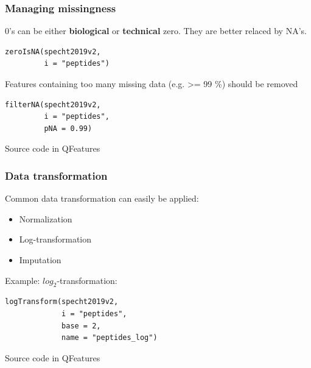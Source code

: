 \documentclass{beamer}
\newcommand{\hcode}[2][lgray]{{\ttfamily\color{vdgray}\colorbox{#1}{#2}}}
\newcommand{\frametitlesection}[1]{\frametitle{\centering #1 \footnotesize \hspace{0pt plus 1 filll} \insertsection}}
\begin{document}
\begin{frame}[fragile]
    \frametitlesection{Managing missingness}

    \hcode{0}'s can be either \textbf{biological} or \textbf{technical} zero.
    They are better relaced by \hcode{NA}'s.

    \begin{lstlisting}
zeroIsNA(specht2019v2,
         i = "peptides")
    \end{lstlisting}

    Features containing too many missing data (e.g. >= 99 \%) should be removed

    \begin{lstlisting}
filterNA(specht2019v2,
         i = "peptides",
         pNA = 0.99)
    \end{lstlisting}

    Source code in \hcode{QFeatures}

\end{frame}

\begin{frame}[fragile]
    \frametitlesection{Data transformation}

    Common data transformation can easily be applied:

    \begin{itemize}
        \item{Normalization}
        \item{Log-transformation}
        \item{Imputation}
    \end{itemize}

    Example: $log_2$-transformation:

    \begin{lstlisting}
logTransform(specht2019v2,
             i = "peptides",
             base = 2,
             name = "peptides_log")
    \end{lstlisting}

    Source code in \hcode{QFeatures}

\end{frame}
\end{document}
